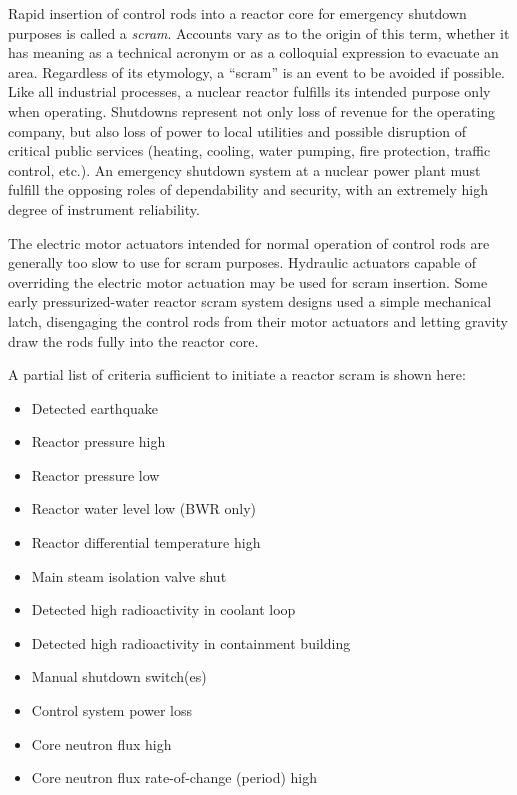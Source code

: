 Rapid insertion of control rods into a reactor core for emergency shutdown purposes is called a \textit{scram}.  Accounts vary as to the origin of this term, whether it has meaning as a technical acronym or as a colloquial expression to evacuate an area.  Regardless of its etymology, a ``scram'' is an event to be avoided if possible.  Like all industrial processes, a nuclear reactor fulfills its intended purpose only when operating.  Shutdowns represent not only loss of revenue for the operating company, but also loss of power to local utilities and possible disruption of critical public services (heating, cooling, water pumping, fire protection, traffic control, etc.).  An emergency shutdown system at a nuclear power plant must fulfill the opposing roles of dependability and security, with an extremely high degree of instrument reliability.  

The electric motor actuators intended for normal operation of control rods are generally too slow to use for scram purposes.  Hydraulic actuators capable of overriding the electric motor actuation may be used for scram insertion.  Some early pressurized-water reactor scram system designs used a simple mechanical latch, disengaging the control rods from their motor actuators and letting gravity draw the rods fully into the reactor core.

\filbreak

A partial list of criteria sufficient to initiate a reactor scram is shown here:

\begin{itemize}
\item Detected earthquake
\item Reactor pressure high
\item Reactor pressure low
\item Reactor water level low (BWR only)
\item Reactor differential temperature high
\item Main steam isolation valve shut
\item Detected high radioactivity in coolant loop
\item Detected high radioactivity in containment building
\item Manual shutdown switch(es)
\item Control system power loss
\item Core neutron flux high
\item Core neutron flux rate-of-change (period) high
\end{itemize}

